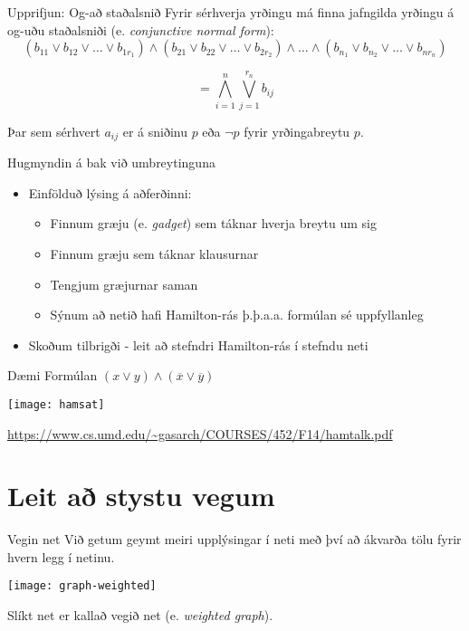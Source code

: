 \documentclass[handout]{beamer}
\begin{document}
\begin{frame}{Upprifjun: Og-að staðalsnið}
    Fyrir sérhverja yrðingu má finna jafngilda yrðingu á og-uðu staðalsniði (e. \emph{conjunctive normal form}):
    \[
     (b_{11} \lor b_{12} \lor \ldots \lor b_{1r_1} ) \land (b_{21} \lor b_{22} \lor \ldots \lor b_{2r_2} ) \land \ldots \land (b_{n_1} \lor b_{n_2} \lor \ldots \lor b_{nr_n} )
    \]
    
    \[
     = \bigwedge_{i=1}^n \bigvee_{j=1}^{r_n}b_{ij}
    \]
    
    Þar sem sérhvert $a_{ij}$ er á sniðinu $p$ eða $\lnot p$ fyrir yrðingabreytu $p$.
\end{frame}

\begin{frame}{Hugmyndin á bak við umbreytinguna}
    \begin{itemize}
        \item Einfölduð lýsing á aðferðinni:
        \begin{itemize}
            \item Finnum græju (e. \emph{gadget}) sem táknar hverja breytu um sig
            \item Finnum græju sem táknar klausurnar
            \item Tengjum græjurnar saman
            \item Sýnum að netið hafi Hamilton-rás þ.þ.a.a. formúlan sé uppfyllanleg
        \end{itemize}
        \item Skoðum tilbrigði - leit að stefndri Hamilton-rás í stefndu neti
    \end{itemize}
\end{frame}

\begin{frame}{Dæmi}
    Formúlan $(x \lor y) \land (\overline{x} \lor \overline{y})$
    \begin{center}
        \texttt{[image: hamsat]}

        \tiny \url{https://www.cs.umd.edu/~gasarch/COURSES/452/F14/hamtalk.pdf}
    \end{center}
\end{frame}

\section{Leit að stystu vegum}

\begin{frame}{Vegin net}
Við getum geymt meiri upplýsingar í neti með því að ákvarða tölu fyrir hvern legg í netinu.
\begin{center}
\texttt{[image: graph-weighted]}
\end{center}
Slíkt net er kallað vegið net (e. \emph{weighted graph}).
\end{frame}
\end{document}
